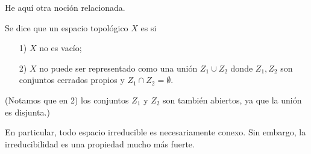 \documentclass{article}
\numberwithin{equation}{section}
\theoremstyle{definition}
\begin{document}
He aquí otra noción relacionada.

\begin{definicion}
  Se dice que un espacio topológico $X$ es  si
  \begin{enumerate}
  \item[1)] $X$ no es vacío;

  \item[2)] $X$ no puede ser representado como una unión $Z_1 \cup Z_2$ donde
    $Z_1,Z_2$ son conjuntos cerrados propios y $Z_1 \cap Z_2 = \emptyset$.
  \end{enumerate}
  (Notamos que en 2) los conjuntos $Z_1$ y $Z_2$ son también abiertos, ya que
  la unión es disjunta.)
\end{definicion}

En particular, todo espacio irreducible es necesariamente conexo. Sin embargo,
la irreducibilidad es una propiedad mucho más fuerte.
\end{document}
